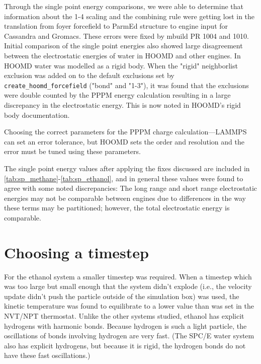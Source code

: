 Through the single point energy comparisons, we were able to determine that information about the 1-4 scaling and the combining rule were getting lost in the translation from foyer forcefield to ParmEd structure to engine input for Cassandra and Gromacs.
These errors were fixed by mbuild PR 1004 and 1010.
Initial comparison of the single point energies also showed large disagreement between the electrostatic energies of water in HOOMD and other engines. 
In HOOMD water was modelled as a rigid body. 
When the "rigid" neighborlist exclusion was added on to the default exclusions set by \lstinline{create_hoomd_forcefield} ("bond" and "1-3"), it was found that the exclusions were double counted by the PPPM energy calculation resulting in a large discrepancy in the electrostatic energy. 
This is now noted in HOOMD's rigid body documentation.

Choosing the correct parameters for the PPPM charge calculation---LAMMPS can set an error tolerance, but HOOMD sets the order and resolution and the error must be tuned using these parameters.

The single point energy values after applying the fixes discussed are included in \autoref{tab:sp_methane}-\autoref{tab:sp_ethanol}, and in general these values were found to agree with some noted discrepancies:
The long range and short range electrostatic energies may not be comparable between engines due to differences in the way these terms may be partitioned; however, the total electrostatic energy is comparable.

\section{Choosing a timestep}

For the ethanol system a smaller timestep was required.
When a timestep which was too large but small enough that the system didn't explode (i.e., the velocity update didn't push the particle outside of the simulation box) was used, the kinetic temperature was found to equilibrate to a lower value than was set in the NVT/NPT thermostat.
Unlike the other systems studied, ethanol has explicit hydrogens with harmonic bonds. 
Because hydrogen is such a light particle, the oscillations of bonds involving hydrogen are very fast.
(The SPC/E water system also has explicit hydrogens, but because it is rigid, the hydrogen bonds do not have these fast oscillations.) 


